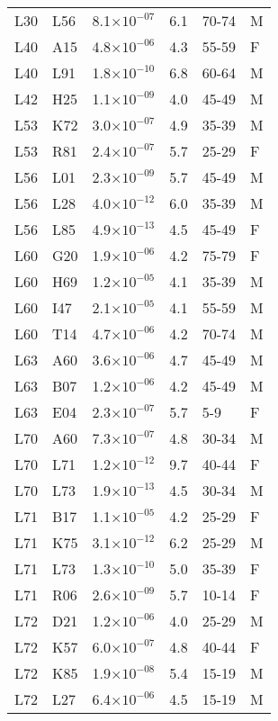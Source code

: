 \begin{longtable}{lllrll}
   L30 & L56 & 8.1$\times10^{-07}$ & 6.1 & 70-74 & M \\ 
   L40 & A15 & 4.8$\times10^{-06}$ & 4.3 & 55-59 & F \\ 
   L40 & L91 & 1.8$\times10^{-10}$ & 6.8 & 60-64 & M \\ 
   L42 & H25 & 1.1$\times10^{-09}$ & 4.0 & 45-49 & M \\ 
   L53 & K72 & 3.0$\times10^{-07}$ & 4.9 & 35-39 & M \\ 
   L53 & R81 & 2.4$\times10^{-07}$ & 5.7 & 25-29 & F \\ 
   L56 & L01 & 2.3$\times10^{-09}$ & 5.7 & 45-49 & M \\ 
   L56 & L28 & 4.0$\times10^{-12}$ & 6.0 & 35-39 & M \\ 
   L56 & L85 & 4.9$\times10^{-13}$ & 4.5 & 45-49 & F \\ 
   L60 & G20 & 1.9$\times10^{-06}$ & 4.2 & 75-79 & F \\ 
   L60 & H69 & 1.2$\times10^{-05}$ & 4.1 & 35-39 & M \\ 
   L60 & I47 & 2.1$\times10^{-05}$ & 4.1 & 55-59 & M \\ 
   L60 & T14 & 4.7$\times10^{-06}$ & 4.2 & 70-74 & M \\ 
   L63 & A60 & 3.6$\times10^{-06}$ & 4.7 & 45-49 & M \\ 
   L63 & B07 & 1.2$\times10^{-06}$ & 4.2 & 45-49 & M \\ 
   L63 & E04 & 2.3$\times10^{-07}$ & 5.7 & 5-9 & F \\ 
   L70 & A60 & 7.3$\times10^{-07}$ & 4.8 & 30-34 & M \\ 
   L70 & L71 & 1.2$\times10^{-12}$ & 9.7 & 40-44 & F \\ 
   L70 & L73 & 1.9$\times10^{-13}$ & 4.5 & 30-34 & M \\ 
   L71 & B17 & 1.1$\times10^{-05}$ & 4.2 & 25-29 & F \\ 
   L71 & K75 & 3.1$\times10^{-12}$ & 6.2 & 25-29 & M \\ 
   L71 & L73 & 1.3$\times10^{-10}$ & 5.0 & 35-39 & F \\ 
   L71 & R06 & 2.6$\times10^{-09}$ & 5.7 & 10-14 & F \\ 
   L72 & D21 & 1.2$\times10^{-06}$ & 4.0 & 25-29 & M \\ 
   L72 & K57 & 6.0$\times10^{-07}$ & 4.8 & 40-44 & F \\ 
   L72 & K85 & 1.9$\times10^{-08}$ & 5.4 & 15-19 & M \\ 
   L72 & L27 & 6.4$\times10^{-06}$ & 4.5 & 15-19 & M \\ 

\end{longtable}
